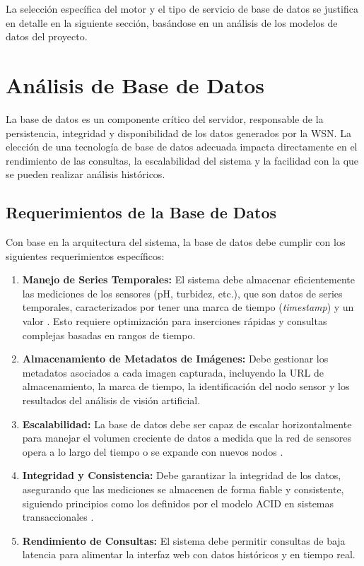 La selección específica del motor y el tipo de servicio de base de datos se justifica en detalle en la siguiente sección, basándose en un análisis de los modelos de datos del proyecto.



\section{Análisis de Base de Datos}
\label{sec:analisis_db}

La base de datos es un componente crítico del servidor, responsable de la persistencia, integridad y disponibilidad de los datos generados por la WSN. La elección de una tecnología de base de datos adecuada impacta directamente en el rendimiento de las consultas, la escalabilidad del sistema y la facilidad con la que se pueden realizar análisis históricos.

\subsection{Requerimientos de la Base de Datos}
\label{subsec:reqs_db}

Con base en la arquitectura del sistema, la base de datos debe cumplir con los siguientes requerimientos específicos:

\begin{enumerate}
    \item \textbf{Manejo de Series Temporales:} El sistema debe almacenar eficientemente las mediciones de los sensores (pH, turbidez, etc.), que son datos de series temporales, caracterizados por tener una marca de tiempo (\textit{timestamp}) y un valor \cite{influxdata2024timeseries}. Esto requiere optimización para inserciones rápidas y consultas complejas basadas en rangos de tiempo.
    \item \textbf{Almacenamiento de Metadatos de Imágenes:} Debe gestionar los metadatos asociados a cada imagen capturada, incluyendo la URL de almacenamiento, la marca de tiempo, la identificación del nodo sensor y los resultados del análisis de visión artificial.
    \item \textbf{Escalabilidad:} La base de datos debe ser capaz de escalar horizontalmente para manejar el volumen creciente de datos a medida que la red de sensores opera a lo largo del tiempo o se expande con nuevos nodos \cite{mongodb2024scalability}.
    \item \textbf{Integridad y Consistencia:} Debe garantizar la integridad de los datos, asegurando que las mediciones se almacenen de forma fiable y consistente, siguiendo principios como los definidos por el modelo ACID en sistemas transaccionales \cite{oracle2024acid}.
    \item \textbf{Rendimiento de Consultas:} El sistema debe permitir consultas de baja latencia para alimentar la interfaz web con datos históricos y en tiempo real.
\end{enumerate}

